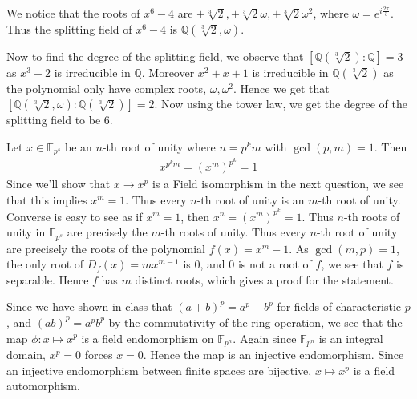 \documentclass[12pt]{exam}
\theoremstyle{plain} %
\theoremstyle{definition} %
\theoremstyle{remark} %
\begin{document}
\begin{questions}
  \question
  \begin{solution}
    We notice that the roots of $x^6 - 4$ are $\pm \sqrt[3]{2}, \pm
    \sqrt[3]{2} \omega, \pm \sqrt[3]{2} \omega^2$, where $\omega =
    e^{i \frac{2\pi}{3}}$. Thus the splitting field of $x^6 - 4$ is
    $\mathbb{Q}(\sqrt[3]{2}, \omega)$.

    Now to find the degree of the splitting field, we observe that
    $[\mathbb{Q}(\sqrt[3]{2}): \mathbb{Q}] = 3$ as $x^3 - 2$ is
    irreducible in $\mathbb{Q}$. Moreover $x^2 + x +1$ is irreducible
    in $\mathbb{Q}(\sqrt[3]{2})$ as the polynomial only have complex
    roots, $\omega, \omega^2$. Hence we get that
    $[\mathbb{Q}(\sqrt[3]{2}, \omega): \mathbb{Q}(\sqrt[3]{2})] = 2$.
    Now using the tower law, we get the degree of the splitting
    field to be $6$.
  \end{solution}

  \question
  \begin{solution}
    Let $x \in \mathbb{F}_{p^s}$ be an $n$-th root of unity
    where $n = p^km$ with $\gcd(p, m) = 1$. Then
    \begin{align*}
      x^{p^k m} = (x^m)^{p^k} = 1
    \end{align*}
    Since we'll show that $x \to x^p$ is a Field isomorphism in the
    next question, we see that this implies $x^m = 1$. Thus every
    $n$-th root of unity is an $m$-th root of unity. Converse is easy
    to see as if $x^m = 1$, then $x^n = (x^m)^{p^k} = 1$. Thus $n$-th
    roots of unity in $\mathbb{F}_{p^s}$ are precisely the $m$-th
    roots of unity. Thus every $n$-th root of unity are precisely the
    roots of the polynomial $f(x) = x^m - 1$. As $\gcd(m, p) = 1$,
    the only root of $D_f(x) = mx^{m-1}$ is $0$, and $0$ is not a
    root of $f$, we see that $f$ is separable. Hence $f$ has $m$
    distinct roots, which gives a proof for the statement.

  \end{solution}

  \question
  \begin{solution}
    Since we have shown in class that $(a + b)^p = a^p + b^p$ for
    fields of characteristic $p$, and $(ab)^p = a^pb^p$ by the
    commutativity of the ring operation, we see that the map $\phi: x
    \mapsto x^p$ is a field endomorphism on $\mathbb{F}_{p^n}$. Again
    since $ \mathbb{F}_{p^n}$ is an integral domain, $x^p = 0$ forces $x
    = 0$. Hence the map is an injective endomorphism.
    Since an injective endomorphism between finite spaces are
    bijective, $x \mapsto x^p$ is a field automorphism.


\end{solution}
\end{questions}
\end{document}
